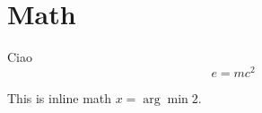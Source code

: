 \section{Math}

\begin{frame}{Ciao}
  \begin{equation}
    e = mc^2
  \end{equation}

  This is inline math $x = \arg\min 2$.
\end{frame}
